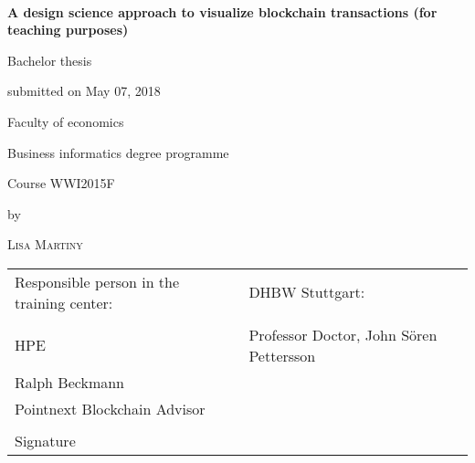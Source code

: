 \newcommand{\typMeinerArbeit}{Bachelor thesis} 

\newcommand{\themaMeinerArbeit}{A design science approach to visualize blockchain transactions (for teaching purposes)}

\thispagestyle{empty}

\begin{spacing}{1}
\begin{center}	
~\vspace{0mm}

{\sffamily
\LARGE  
\textbf{A design science approach to visualize blockchain transactions (for teaching purposes)}

}


\vspace{15mm}

{\Large \typMeinerArbeit}

\vspace{1cm}

submitted on May 07, 2018
\vspace{15mm}
\medskip

Faculty of economics
\medskip

Business informatics degree programme
\medskip

Course WWI2015F

\vspace{10mm}

by

\vspace{10mm}

{\large\textsc{Lisa Martiny}}

\vspace{10mm}
\end{center}

\vfill

\begin{tabular}{ll}
Responsible person in the training center: & DHBW Stuttgart: \\
\hspace{0.4\linewidth} & \\
HPE & Professor Doctor, John Sören Pettersson \\
Ralph Beckmann  &  \\
Pointnext Blockchain Advisor \\
\\
Signature \\
\end{tabular}


\vspace{1cm}
\end{spacing}

